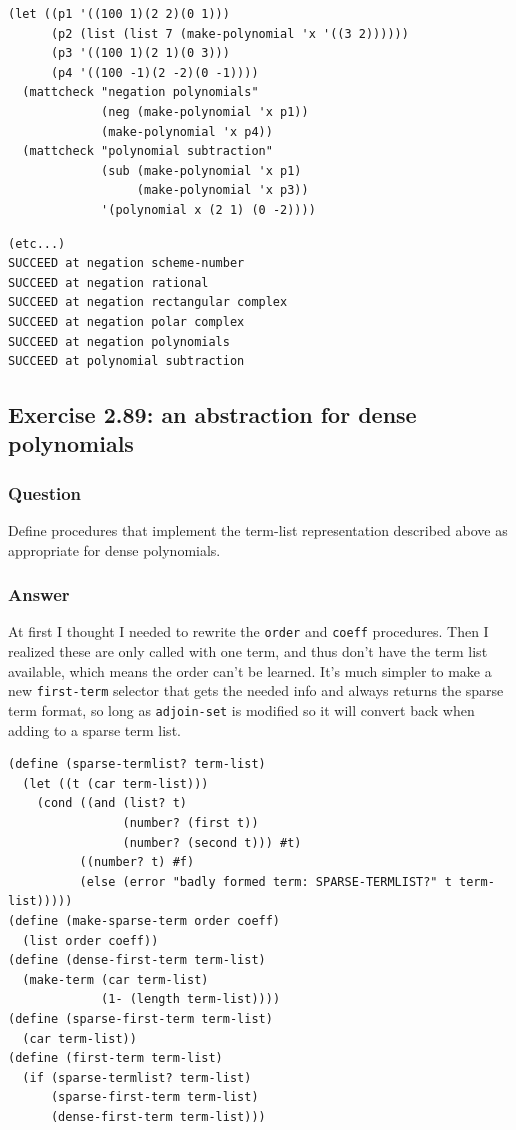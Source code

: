 \documentclass[final,fleqn,titlepage,twoside]{article}
\begin{document}
\begin{verbatim}
(let ((p1 '((100 1)(2 2)(0 1)))
      (p2 (list (list 7 (make-polynomial 'x '((3 2))))))
      (p3 '((100 1)(2 1)(0 3)))
      (p4 '((100 -1)(2 -2)(0 -1))))
  (mattcheck "negation polynomials"
             (neg (make-polynomial 'x p1))
             (make-polynomial 'x p4))
  (mattcheck "polynomial subtraction"
             (sub (make-polynomial 'x p1)
                  (make-polynomial 'x p3))
             '(polynomial x (2 1) (0 -2))))
\end{verbatim}

\begin{verbatim}
(etc...)
SUCCEED at negation scheme-number
SUCCEED at negation rational
SUCCEED at negation rectangular complex
SUCCEED at negation polar complex
SUCCEED at negation polynomials
SUCCEED at polynomial subtraction
\end{verbatim}

\subsection{Exercise 2.89: an abstraction for dense polynomials}
\label{sec:org05ee2d4}
\subsubsection{Question}
\label{sec:org398d35c}
Define procedures that implement the term-list representation described above as
appropriate for dense polynomials.

\subsubsection{Answer}
\label{sec:org80568fb}
At first I thought I needed to rewrite the \texttt{order} and \texttt{coeff} procedures. Then
I realized these are only called with one term, and thus don't have the term
list available, which means the order can't be learned. It's much simpler to
make a new \texttt{first-term} selector that gets the needed info and always returns
the sparse term format, so long as \texttt{adjoin-set} is modified so it will convert
back when adding to a sparse term list.

\begin{verbatim}
(define (sparse-termlist? term-list)
  (let ((t (car term-list)))
    (cond ((and (list? t)
                (number? (first t))
                (number? (second t))) #t)
          ((number? t) #f)
          (else (error "badly formed term: SPARSE-TERMLIST?" t term-list)))))
(define (make-sparse-term order coeff)
  (list order coeff))
(define (dense-first-term term-list)
  (make-term (car term-list)
             (1- (length term-list))))
(define (sparse-first-term term-list)
  (car term-list))
(define (first-term term-list)
  (if (sparse-termlist? term-list)
      (sparse-first-term term-list)
      (dense-first-term term-list)))
\end{verbatim}
\end{document}
